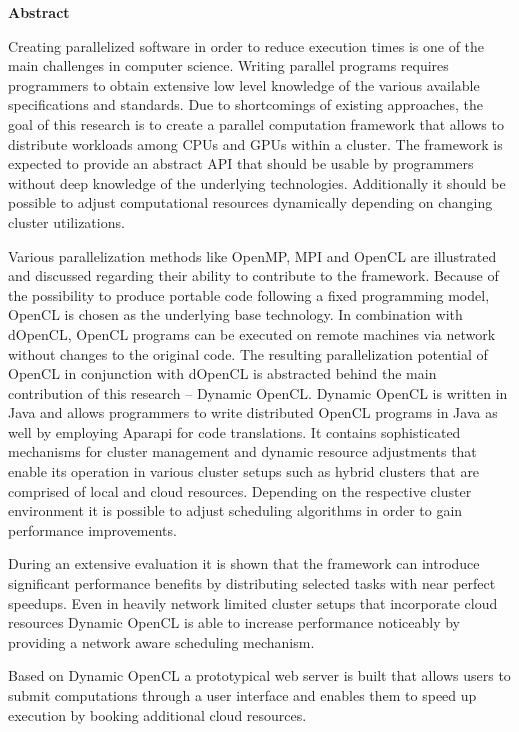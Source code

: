 \begin{center}\textsf{\textbf{Abstract}}\end{center}

\noindent Creating parallelized software in order to reduce execution times is one of the main challenges in computer science. Writing parallel programs requires programmers to obtain extensive low level knowledge of the various available specifications and standards. Due to shortcomings of existing approaches, the goal of this research is to create a parallel computation framework that allows to distribute workloads among CPUs and GPUs within a cluster. The framework is expected to provide an abstract API that should be usable by programmers without deep knowledge of the underlying technologies. Additionally it should be possible to adjust computational resources dynamically depending on changing cluster utilizations.

Various parallelization methods like OpenMP, MPI and OpenCL are illustrated and discussed regarding their ability to contribute to the framework. Because of the possibility to produce portable code following a fixed programming model, OpenCL is chosen as the underlying base technology. In combination with dOpenCL, OpenCL programs can be executed on remote machines via network without changes to the original code. The resulting parallelization potential of OpenCL in conjunction with dOpenCL is abstracted behind the main contribution of this research -- Dynamic OpenCL. Dynamic OpenCL is written in Java and allows programmers to write distributed OpenCL programs in Java as well by employing Aparapi for code translations. It contains sophisticated mechanisms for cluster management and dynamic resource adjustments that enable its operation in various cluster setups such as hybrid clusters that are comprised of local and cloud resources. Depending on the respective cluster environment it is possible to adjust scheduling algorithms in order to gain performance improvements.

During an extensive evaluation it is shown that the framework can introduce significant performance benefits by distributing selected tasks with near perfect speedups. Even in heavily network limited cluster setups that incorporate cloud resources Dynamic OpenCL is able to increase performance noticeably by providing a network aware scheduling mechanism.

Based on Dynamic OpenCL a prototypical web server is built that allows users to submit computations through a user interface and enables them to speed up execution by booking additional cloud resources.


